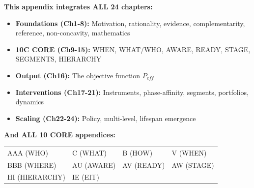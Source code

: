 \begin{tcolorbox}[colback=purple!5!white, colframe=purple!75!black,
    title=Chapter \& Appendix Integration]

\textbf{This appendix integrates ALL 24 chapters:}
\begin{itemize}[nosep]
\item \textbf{Foundations (Ch1-8):} Motivation, rationality, evidence, complementarity, reference, non-concavity, mathematics
\item \textbf{10C CORE (Ch9-15):} WHEN, WHAT/WHO, AWARE, READY, STAGE, SEGMENTS, HIERARCHY
\item \textbf{Output (Ch16):} The objective function $P_{eff}$
\item \textbf{Interventions (Ch17-21):} Instruments, phase-affinity, segments, portfolios, dynamics
\item \textbf{Scaling (Ch22-24):} Policy, multi-level, lifespan emergence
\end{itemize}

\textbf{And ALL 10 CORE appendices:}
\begin{center}
\small
\begin{tabular}{llll}
AAA (WHO) & C (WHAT) & B (HOW) & V (WHEN) \\
BBB (WHERE) & AU (AWARE) & AV (READY) & AW (STAGE) \\
HI (HIERARCHY) & IE (EIT) & & \\
\end{tabular}
\end{center}

\end{tcolorbox}


